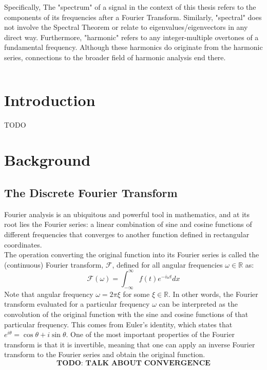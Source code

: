 \documentclass[11pt,twoside]{report}
\newcommand{\w}{\omega}
\numberwithin{thm}{section}
\numberwithin{equation}{section}
\begin{document}
Specifically, The "spectrum" of a signal in the context of this thesis refers to the components of its frequencies after a Fourier Transform. Similarly, "spectral" does not involve the Spectral Theorem or relate to eigenvalues/eigenvectors in any direct way. Furthermore, "harmonic" refers to any integer-multiple overtones of a fundamental frequency. Although these harmonics do originate from the harmonic series, connections to the broader field of harmonic analysis end there.

\begin{tabular}{cp{\textwidth}}


\end{tabular}




\makeatletter
\if@twoside \ifodd\value{page}
\clearpage\mbox{}\thispagestyle{empty} \fi \fi
\makeatother



\clearpage
{}

\chapter*{Introduction}
TODO

\chapter{Background}
\section{The Discrete Fourier Transform}
Fourier analysis is an ubiquitous and powerful tool in mathematics, and at its root lies the Fourier series: a linear combination of sine and cosine functions of different frequencies that converges to another function defined in rectangular coordinates. \\

The operation converting the original function into its Fourier series is called the (continuous) Fourier transform, $\mathcal{F}$, defined for all angular frequencies $\w \in \mathbb{R}$ as:
$$\mathcal{F}(\w) = \int_{-\infty}^\infty f(t) e^{-i\w t}dx$$
Note that angular frequency $\w = 2\pi\xi$ for some $\xi \in \mathbb{R}$. In other words, the Fourier transform evaluated for a particular frequency $\w$ can be interpreted as the convolution of the original function with the sine and cosine functions of that particular frequency. This comes from Euler's identity, which states that $e^{i\theta} = \cos\theta + i\sin\theta$. One of the most important properties of the Fourier transform is that it is invertible, meaning that one can apply an inverse Fourier transform to the Fourier series and obtain the original function.
$$\textbf{TODO: TALK ABOUT CONVERGENCE}$$
\end{document}

